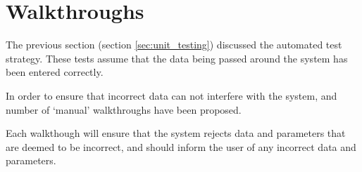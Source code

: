 \section{Walkthroughs}
\label{sec:walkthroughs}

The previous section (section \ref{sec:unit_testing}) discussed the automated 
test strategy. These tests assume that the data being passed around the system 
has been entered correctly.

In order to ensure that incorrect data can not interfere with the system, and 
number of `manual' walkthroughs have been proposed.

Each walkthough will ensure that the system rejects data and parameters that 
are deemed to be incorrect, and should inform the user of any incorrect data 
and parameters.

